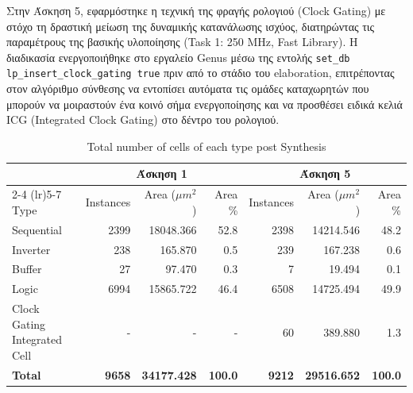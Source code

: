 Στην Άσκηση 5, εφαρμόστηκε η τεχνική της φραγής ρολογιού (Clock Gating) με στόχο τη δραστική μείωση της δυναμικής κατανάλωσης ισχύος, διατηρώντας τις παραμέτρους της βασικής υλοποίησης (Task 1: 250 MHz, Fast Library). Η διαδικασία ενεργοποιήθηκε στο εργαλείο Genus μέσω της εντολής \texttt{set\_db lp\_insert\_clock\_gating true} πριν από το στάδιο του elaboration, επιτρέποντας στον αλγόριθμο σύνθεσης να εντοπίσει αυτόματα τις ομάδες καταχωρητών που μπορούν να μοιραστούν ένα κοινό σήμα ενεργοποίησης και να προσθέσει ειδικά κελιά ICG (Integrated Clock Gating) στο δέντρο του ρολογιού.

\begin{table}[H]
    \centering
    \caption{Total number of cells of each type post Synthesis}
    \begin{tabular}{lrrrrrr}
        \toprule
         & \multicolumn{3}{c}{\textbf{Άσκηση 1}} & \multicolumn{3}{c}{\textbf{Άσκηση 5}} \\
        \cmidrule(lr){2-4} \cmidrule(lr){5-7}
        Type & Instances & Area ($\mu m^2$) & Area \% & Instances & Area ($\mu m^2$) & Area \% \\
        \midrule
        Sequential & 2399 & 18048.366 & 52.8 & 2398 & 14214.546 & 48.2 \\
        Inverter & 238 & 165.870 & 0.5 & 239 & 167.238 & 0.6 \\
        Buffer & 27 & 97.470 & 0.3 & 7 & 19.494 & 0.1 \\
        Logic & 6994 & 15865.722 & 46.4 & 6508 & 14725.494 & 49.9 \\
        Clock Gating Integrated Cell & - & - & - & 60 & 389.880 & 1.3 \\
        \midrule
        \textbf{Total} & \textbf{9658} & \textbf{34177.428} & \textbf{100.0} & \textbf{9212} & \textbf{29516.652} & \textbf{100.0} \\
        \bottomrule
    \end{tabular}
\end{table}

